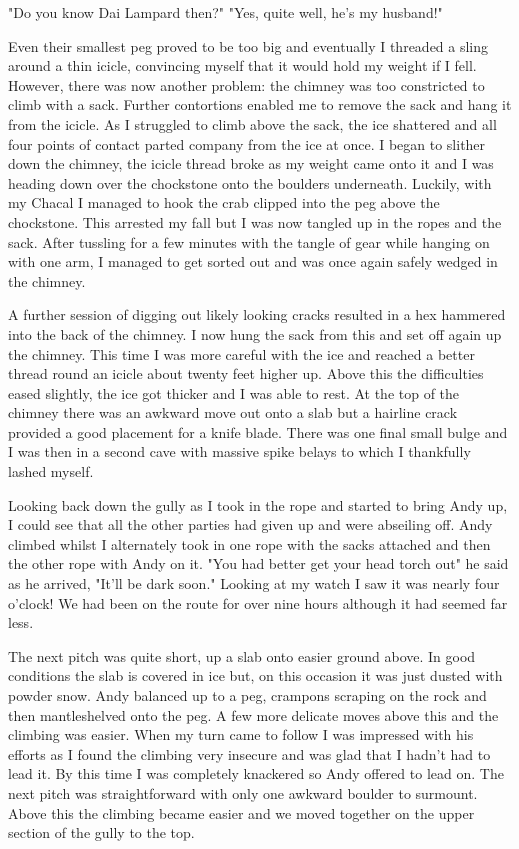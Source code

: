 \documentclass[a5paper,openany,font 10pt]{scrbook}
\begin{document}
"Do you know Dai Lampard then?"
"Yes, quite well, he's my husband!"

Even their smallest peg proved to be too big and eventually
I threaded a sling around a thin icicle, convincing myself that
it would hold my weight if I fell. However, there was now another
problem: the chimney was too constricted to climb with a sack.
Further contortions enabled me to remove the sack and hang it
from the icicle. As I struggled to climb above the sack, the ice
shattered and all four points of contact parted company from the
ice at once. I began to  slither down the chimney, the icicle
thread broke as my weight came onto it and I was heading down
over the chockstone onto the boulders underneath. Luckily, with
my Chacal I managed to hook the crab clipped into the peg above
the chockstone. This arrested my fall but I was now tangled up in
the ropes and the sack.  After tussling for a few minutes with
the tangle of gear while hanging on with one arm, I managed to
get sorted out and was once again safely wedged in the chimney.

A further session of digging out likely looking cracks
resulted in a hex hammered into the back of the chimney. I now
hung the sack from this and set off again up the chimney. This
time I was more careful with the ice and reached a better thread
round an icicle about twenty feet higher up. Above this the
difficulties eased slightly, the ice got thicker and I was able
to rest. At the top of the chimney there was an awkward move out
onto a slab but a hairline crack provided a good placement for a
knife blade. There was one final small bulge and I was then in a
second cave with massive spike belays to which I thankfully
lashed myself.

Looking back down the gully as I took in the rope and
started to bring Andy up, I could see that all the other parties
had given up and were abseiling off. Andy climbed whilst I
alternately took in one rope with the sacks attached and then the
other rope with Andy on it.
	"You had better get your head torch out" he said as he
arrived, "It'll be dark soon."
	Looking at my watch I saw it was nearly four o'clock! We had
been on the route for over nine hours although it had seemed far
less.

The next pitch was quite short, up a slab onto easier ground
above. In good conditions the slab is covered in ice but, on this
occasion it was just dusted with powder snow. Andy balanced up to
a peg, crampons scraping on the rock and then mantleshelved onto
the peg. A few more delicate moves above this and the climbing
was easier. When my turn came to follow I was impressed with his
efforts as I found the climbing very insecure and was glad that I
hadn't had to lead it. By this time I was completely knackered so
Andy offered to lead on. The next pitch was straightforward with
only one awkward boulder to surmount. Above this the climbing
became easier and we moved together on the upper section of the
gully to the top.
\end{document}
